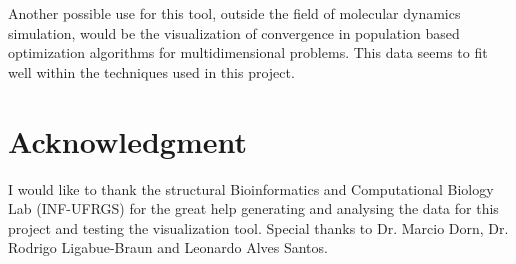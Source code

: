 \documentclass[10pt, conference]{IEEEtran}
\begin{document}
Another possible use for this tool, outside the field of molecular dynamics simulation, would be the visualization of convergence in population based optimization algorithms for multidimensional problems. This data seems to fit well within the techniques used in this project.

\iffinal
\section*{Acknowledgment}
%
I would like to thank the structural Bioinformatics and Computational Biology Lab (INF-UFRGS) for the great help generating and analysing the data for this project and testing the visualization tool. Special thanks to Dr. Marcio Dorn, Dr. Rodrigo Ligabue-Braun and Leonardo Alves Santos. 

\fi





\end{document}
